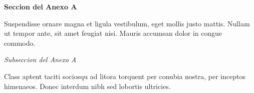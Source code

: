 \newpage
{}
\LARGE\textbf{Seccion del Anexo A}

\normalsize
Suspendisse ornare magna et ligula vestibulum, eget mollis justo mattis. Nullam ut tempor ante, sit amet feugiat nisi. Mauris accumsan dolor in congue commodo.

\normalsize\textit{Subseccion del Anexo A}

Class aptent taciti sociosqu ad litora torquent per conubia nostra, per inceptos himenaeos. Donec interdum nibh sed lobortis ultricies.